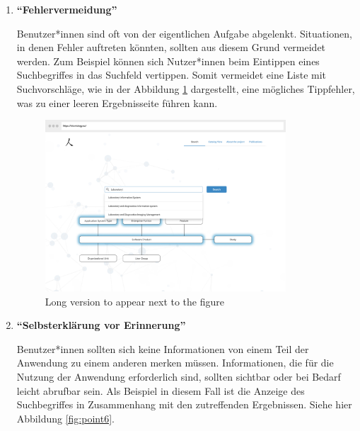 \begin{enumerate}

\item \textbf{\enquote{Fehlervermeidung}} \newline

Benutzer*innen sind oft von der eigentlichen Aufgabe abgelenkt.
Situationen, in denen Fehler auftreten könnten, sollten aus diesem Grund vermeidet werden.
Zum Beispiel können sich Nutzer*innen beim Eintippen eines Suchbegriffes in das Suchfeld vertippen.
Somit vermeidet eine Liste mit Suchvorschläge, wie in der Abbildung \ref{fig:point5_danach} dargestellt, eine mögliches Tippfehler, was zu einer leeren Ergebnisseite führen kann.

\begin{figure}
	\centering
    	\includegraphics[width=0.85\textwidth]{Images/Mockup_Startseite_3}
   	\caption[Suche mit Suchvorschläge]{Long version to appear next to the figure}
   	\label{fig:point5_danach}
\end{figure}

\clearpage


\item \textbf{\enquote{Selbsterklärung vor Erinnerung}} \newline

Benutzer*innen sollten sich keine Informationen von einem Teil der Anwendung zu einem anderen merken müssen. 
Informationen, die für die Nutzung der Anwendung erforderlich sind, sollten sichtbar oder bei Bedarf leicht abrufbar sein.
Als Beispiel in diesem Fall ist die Anzeige des Suchbegriffes in Zusammenhang mit den zutreffenden Ergebnissen.
Siehe hier Abbildung \ref{fig:point6}.


\end{enumerate}
